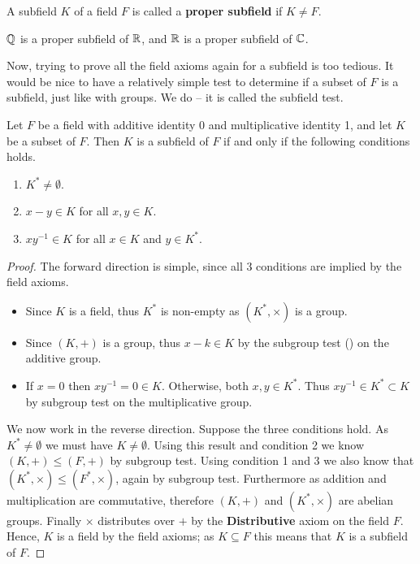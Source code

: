 \begin{definition}
    A subfield $K$ of a field $F$ is called a \textbf{proper subfield} if $K \neq F$.
\end{definition}

\begin{example}
    $\mathbb{Q}$ is a proper subfield of $\mathbb{R}$, and $\mathbb{R}$ is a proper subfield of $\mathbb{C}$.
\end{example}

Now, trying to prove all the field axioms again for a subfield is too tedious. It would be nice to have a relatively simple test to determine if a subset of $F$ is a subfield, just like with groups. We do -- it is called the subfield test.

\begin{theorem}\label{thrm-subfield-test}
    Let $F$ be a field with additive identity 0 and multiplicative identity 1, and let $K$ be a subset of $F$. Then $K$ is a subfield of $F$ if and only if the following conditions holds.
    \begin{enumerate}
        \item $K^\ast \neq \emptyset$.
        \item $x - y \in K$ for all $x, y \in K$.
        \item $xy^{-1} \in K$ for all $x \in K$ and $y \in K^\ast$.
    \end{enumerate}
\end{theorem}
\begin{proof}
    The forward direction is simple, since all 3 conditions are implied by the field axioms.
    \begin{itemize}
        \item Since $K$ is a field, thus $K^\ast$ is non-empty as $(K^\ast, \times)$ is a group.
        \item Since $(K, +)$ is a group, thus $x - k \in K$ by the subgroup test () on the additive group.
        \item If $x = 0$ then $xy^{-1} = 0 \in K$. Otherwise, both $x, y \in K^\ast$. Thus $xy^{-1} \in K^\ast \subset K$ by subgroup test on the multiplicative group.
    \end{itemize}

    We now work in the reverse direction. Suppose the three conditions hold. As $K^\ast \neq \emptyset$ we must have $K \neq \emptyset$. Using this result and condition 2 we know $(K, +) \leq (F, +)$ by subgroup test. Using condition 1 and 3 we also know that $(K^\ast, \times) \leq (F^\ast, \times)$, again by subgroup test. Furthermore as addition and multiplication are commutative, therefore $(K, +)$ and $(K^\ast, \times)$ are abelian groups. Finally $\times$ distributes over $+$ by the \textbf{Distributive} axiom on the field $F$. Hence, $K$ is a field by the field axioms; as $K \subseteq F$ this means that $K$ is a subfield of $F$.
\end{proof}

